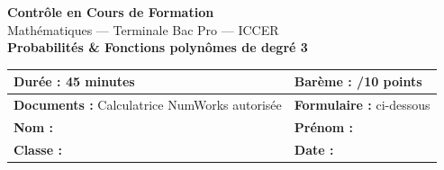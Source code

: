\documentclass[a4paper,11pt]{article}
\begin{document}
\begin{center}
{\LARGE\bfseries\color{bleupro} Contrôle en Cours de Formation}\\[8pt]
{\large Mathématiques — Terminale Bac Pro — ICCER}\\[12pt]
{\Large\bfseries Probabilités \& Fonctions polynômes de degré 3}\\[20pt]

\begin{tabular}{|p{6cm}|p{6cm}|}
\hline
\textbf{Durée :} 45 minutes & \textbf{Barème :} /10 points \\
\hline
\textbf{Documents :} Calculatrice NumWorks autorisée & \textbf{Formulaire :} ci-dessous \\
\hline
\textbf{Nom :} \dotfill & \textbf{Prénom :} \dotfill \\
\hline
\textbf{Classe :} \dotfill & \textbf{Date :} \dotfill \\
\hline
\end{tabular}
\end{center}

\vspace{10pt}
\end{document}
